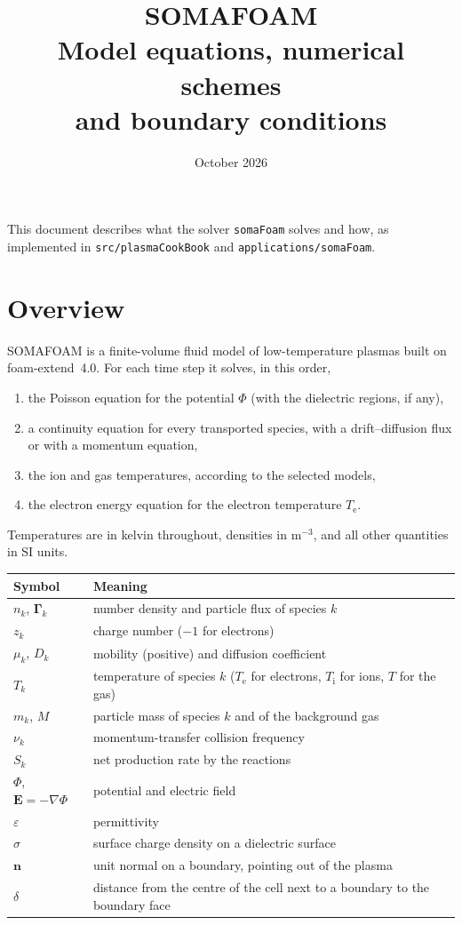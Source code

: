 \documentclass[11pt,a4paper]{article}
\title{SOMAFOAM\\[4pt]\large Model equations, numerical schemes\\ and boundary conditions}
\author{}
\date{October 2026}
\newcommand{\kw}[1]{\texttt{#1}}
\newcommand{\bG}{\boldsymbol{\Gamma}}
\newcommand{\bE}{\mathbf{E}}
\newcommand{\bn}{\mathbf{n}}
\newcommand{\Te}{T_\mathrm{e}}
\begin{document}
\maketitle

\noindent
This document describes what the solver \kw{somaFoam} solves and how, as
implemented in \kw{src/plasmaCookBook} and \kw{applications/somaFoam}.

\tableofcontents

\section{Overview}

SOMAFOAM is a finite-volume fluid model of low-temperature plasmas built on
foam-extend~4.0. For each time step it solves, in this order,
\begin{enumerate}
\item the Poisson equation for the potential $\Phi$ (with the dielectric
      regions, if any),
\item a continuity equation for every transported species, with a
      drift--diffusion flux or with a momentum equation,
\item the ion and gas temperatures, according to the selected models,
\item the electron energy equation for the electron temperature $\Te$.
\end{enumerate}
Temperatures are in kelvin throughout, densities in m$^{-3}$, and all other
quantities in SI units.

\begin{table}[h]
\centering
\begin{tabular}{@{}ll@{}}
\toprule
Symbol & Meaning \\
\midrule
$n_k$, $\bG_k$ & number density and particle flux of species $k$ \\
$z_k$ & charge number ($-1$ for electrons) \\
$\mu_k$, $D_k$ & mobility (positive) and diffusion coefficient \\
$T_k$ & temperature of species $k$ ($\Te$ for electrons, $T_\mathrm{i}$ for ions, $T$ for the gas) \\
$m_k$, $M$ & particle mass of species $k$ and of the background gas \\
$\nu_k$ & momentum-transfer collision frequency \\
$S_k$ & net production rate by the reactions \\
$\Phi$, $\bE=-\nabla\Phi$ & potential and electric field \\
$\varepsilon$ & permittivity \\
$\sigma$ & surface charge density on a dielectric surface \\
$\bn$ & unit normal on a boundary, pointing out of the plasma \\
$\delta$ & distance from the centre of the cell next to a boundary to the boundary face \\
\bottomrule
\end{tabular}
\end{table}
\end{document}
